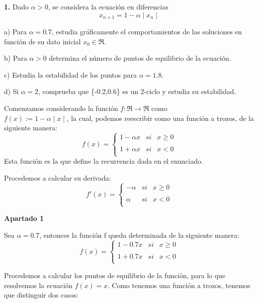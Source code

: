 \documentclass[a4paper, 12pt]{article}
\theoremstyle{plain}
\theoremstyle{definition}
\theoremstyle{remark}
\begin{document}
	\begin{flushleft}
	\textbf{1.} Dado $\alpha > 0$, se considera la ecuación en diferencias
	\[x_{n+1}=1-\alpha\mid x_n\mid\]
	
	a) Para $\alpha=0.7$, estudia gráficamente el comportamientos de las soluciones en función de su dato inicial $x_0 \in \Re$.
	
	b) Para $\alpha> 0$ determina el número de puntos de equilibrio de la ecuación.
	
	c) Estudia la estabilidad de los puntos para $\alpha= 1.8$.
	
	d) Si $\alpha=2$, comprueba que \{-0.2,0.6\} es un 2-ciclo y estudia su estabilidad.
	
	\end{flushleft}

	\bigskip
	Comenzamos considerando la función $f:\Re \rightarrow \Re$ como \\$f(x):=1-\alpha\mid x\mid$, la cual, podemos reescribir como una función a trozos, de la siguiente manera:
	\[f(x)= \left\{ \begin{array}{lcc}
	1-\alpha x &   si  & x \geq 0 \\
	\\ 1+\alpha x &  si & x < 0 \\
	\end{array}
	\right.\]
	Esta función es la que define la recurrencia dada en el enunciado.
	
	Procedemos a calcular su derivada:
	\[f'(x)= \left\{ \begin{array}{lcc}
	-\alpha &   si  & x \geq 0 \\
	\\\alpha &  si & x < 0 \\
	\end{array}
	\right.\]
	
	\textbf{Apartado 1}
	
	Sea $\alpha=0.7$, entonces la función f queda determinada de la siguiente manera:
	\[f(x)= \left\{ \begin{array}{lcc}
	1-0.7 x &   si  & x \geq 0 \\
	\\ 1+0.7 x &  si & x < 0 \\
	\end{array}
	\right.\]
	
	Procedemos a calcular los puntos de equilibrio de la función, para lo que resolvemos la ecuación $f(x) = x$. Como tenemos una función a trozos, tenemos que distinguir dos casos:
	
\end{document}
